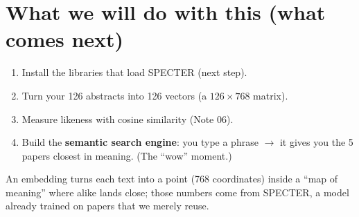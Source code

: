 \documentclass[11pt,a4paper]{article}
\begin{document}
\section{What we will do with this (what comes next)}

\begin{enumerate}
  \item Install the libraries that load SPECTER (next step).
  \item Turn your 126 abstracts into 126 vectors (a $126 \times 768$ matrix).
  \item Measure likeness with cosine similarity (Note 06).
  \item Build the \textbf{semantic search engine}: you type a phrase $\rightarrow$ it gives
        you the 5 papers closest in meaning. (The ``wow'' moment.)
\end{enumerate}

\begin{resumen}
An embedding turns each text into a point (768 coordinates) inside a ``map of meaning'' where
alike lands close; those numbers come from SPECTER, a model already trained on papers that we
merely reuse.
\end{resumen}
\end{document}

